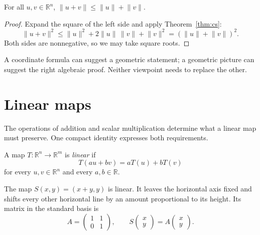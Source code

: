 \documentclass{hubbardbook}
\newcommand{\R}{\mathbb{R}}
\newcommand{\norm}[1]{\lVert #1\rVert}
\begin{document}
\begin{corollary}\label{cor:triangle}
For all \(u,v\in\R^n\),
\(\norm{u+v}\leq\norm{u}+\norm{v}\).
\end{corollary}
\begin{proof}
Expand the square of the left side and apply Theorem~\ref{thm:cs}:
\[
  \norm{u+v}^2
  \leq\norm{u}^2+2\norm{u}\,\norm{v}+\norm{v}^2
  =(\norm{u}+\norm{v})^2.
\]
Both sides are nonnegative, so we may take square roots.
\end{proof}

\begin{remark*}
A coordinate formula can suggest a geometric statement; a geometric
picture can suggest the right algebraic proof. Neither viewpoint needs
to replace the other.
\end{remark*}

\clearpage
\section{Linear maps}
\label{sec:linear}
The operations of addition and scalar multiplication determine what a
linear map must preserve. One compact identity expresses both requirements.

\begin{definition}\label{def:linear}
A map \(T\colon\R^n\to\R^m\) is \emph{linear} if
\begin{equation}\label{eq:linear}
  T(au+bv)=aT(u)+bT(v)
\end{equation}
for every \(u,v\in\R^n\) and every \(a,b\in\R\).
\end{definition}

\begin{example}[A shear]\label{ex:shear}
The map \(S(x,y)=(x+y,y)\) is linear. It leaves the horizontal axis
fixed and shifts every other horizontal line by an amount proportional
to its height. Its matrix in the standard basis is
\begin{equation}\label{eq:shear}
  A=\begin{pmatrix}1&1\\0&1\end{pmatrix},
  \qquad S\begin{pmatrix}x\\y\end{pmatrix}
  =A\begin{pmatrix}x\\y\end{pmatrix}.
\end{equation}
\end{example}
\end{document}
